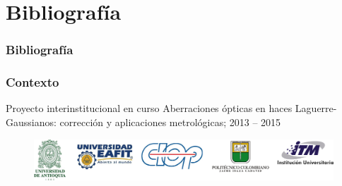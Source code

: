 \documentclass[xcolor=table,serif]{beamer}
\newif\ifplacelogo %
\begin{document}
\section{Bibliografía}
\tiny
  \begin{frame}[allowframebreaks]
  \frametitle{Bibliograf\'ia}
\nocite{*}
  
  
  \end{frame}
\placelogotrue
   
 \begin{frame}
   \frametitle{Contexto}
   \begin{block}{\centering Proyecto interinstitucional en curso} 
	\justifying
   Aberraciones ópticas en haces Laguerre-Gaussianos:
       corrección y aplicaciones metrológicas; 2013 – 2015
   \end{block}
   \begin{figure}
     \centering
     \includegraphics[scale = .5]{Figures/presentation/instituciones.png}
   \end{figure}
 \end{frame}
 
\end{document}
